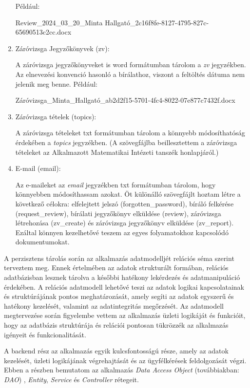 \begin{enumerate}
\begin{itemize}
\end{itemize}

Például:

Review\_2024\_03\_20\_Minta Hallgató\_2c16f8fe-8127-4795-827c-65690513c2cc.docx


\item{Záróvizsga Jegyzőkönyvek (zv):}

A záróvizsga jegyzőkönyveket is word formátumban tárolom a \textit{zv} jegyzékben. Az elnevezési konvenció hasonló a bírálathoz, viszont a feltöltés dátuma nem jelenik meg benne. Például: 

Záróvizsga\_Minta\_Hallgató\_ab2d2f15-5701-4fc4-8022-07e877c7432f.docx

\item{Záróvizsga tételek (topics):}

A záróvizsga tételeket txt formátumban tárolom a könnyebb módosíthatóság érdekében a \textit{topics} jegyzékben. (A szövegfájlba beillesztettem a záróvizsga tételeket az Alkalmazott Matematikai Intézeti tanszék honlapjáról.)


\item{E-mail (email):}

Az e-maileket az \textit{email} jegyzékben txt formátumban tárolom, hogy könnyebben módosíthassam azokat. Öt különálló szövegfájlt hoztam létre a következő célokra: elfelejtett jelszó (forgotten\_password), bíráló felkérése (request\_review), bírálati jegyzőkönyv elküldése (review), záróvizsga létrehozása (zv\_create) és záróvizsga jegyzőkönyv elküldése (zv\_report). Ezáltal könnyen kezelhetővé teszem az egyes folyamatokhoz kapcsolódó dokumentumokat.

\end{enumerate}

A perzisztens tárolás során az alkalmazás adatmodelljét relációs séma szerint terveztem meg. Ennek értelmében az adatok strukturált formában, relációs adatbázisban lesznek tárolva a későbbi hatékony lekérdezés és adatmanipuláció érdekében. A relációs adatmodell lehetővé teszi az adatok logikai kapcsolatainak és struktúrájának pontos meghatározását, amely segíti az adatok egyszerű és hatékony kezelését, valamint az adatintegritás megőrzését. Az adatmodell megtervezése során figyelembe vettem az alkalmazás üzleti logikáját és funkcióit, hogy az adatbázis struktúrája és relációi pontosan tükrözzék az alkalmazás igényeit és funkcionalitását.


A backend rész az alkalmazás egyik kulcsfontosságú része, amely az adatok kezelését, üzleti logikájának végrehajtását és az ügyfélkérések feldolgozását végzi. Ebben a részben bemutatom az alkalmazás \textit{Data Access Object} (továbbiakban: \textit{DAO}) \cite{DAO}, \textit{Entity}, \textit{Service} és \textit{Controller} rétegeit.

